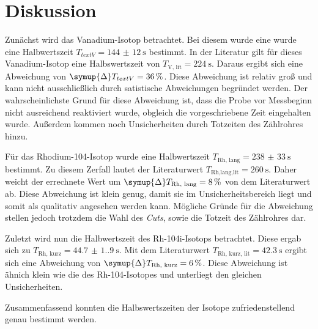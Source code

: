 \section{Diskussion}
\label{sec:Diskussion}
Zunächst wird das Vanadium-Isotop betrachtet. Bei diesem wurde eine wurde eine Halbwertszeit $T_{text{V}} = \qty{144(12)}{\second}$ bestimmt. In der Literatur gilt für dieses 
Vanadium-Isotop eine Halbswertszeit von $T_\text{V, lit} = \qty{224}{\second}$\cite{Zerfall}. Daraus ergibt sich eine Abweichung von $\symup{\Delta}T_{text{V}} = \qty{36}{\percent}$.
Diese Abweichung ist relativ groß und kann nicht ausschließlich durch satistische Abweichungen begründet werden. Der wahrscheinlichste Grund für diese Abweichung ist, dass 
die Probe vor Messbeginn nicht ausreichend reaktiviert wurde, obgleich die vorgeschriebene Zeit eingehalten wurde. Außerdem kommen noch Unsicherheiten durch Totzeiten
des Zählrohres hinzu. 

Für das Rhodium-104-Isotop wurde eine Halbwertszeit $T_\text{Rh, lang} = \qty{238(33)}{\second}$ bestimmt. Zu diesem Zerfall lautet der Literaturwert 
$T_\text{Rh,lang,lit} = \qty{260}{\second}$\cite{Zerfall}. Daher weicht der errechnete Wert um $\symup{\Delta}T_\text{Rh, lang} = \qty{8}{\percent}$ von dem Literaturwert ab.
Diese Abweichung ist klein genug, damit sie im Unsicherheitsbereich liegt und somit als qualitativ angesehen werden kann. Mögliche Gründe für die Abweichung stellen jedoch 
trotzdem die Wahl des \textit{Cuts}, sowie die Totzeit des Zählrohres dar.

Zuletzt wird nun die Halbwertszeit des Rh-104i-Isotops betrachtet. Diese ergab sich zu $T_\text{Rh, kurz} = \qty{44.7(1.9)}{\second}$. Mit dem Literaturwert 
$T_\text{Rh, kurz, lit} = \qty{42.3}{\second}$\cite{104iRh} ergibt sich eine Abweichung von $\symup{\Delta}T_\text{Rh, kurz} = \qty{6}{\percent}$. Diese Abweichung ist ähnich klein wie die 
des Rh-104-Isotopes und unterliegt den gleichen Unsicherheiten.

Zusammenfassend konnten die Halbswertszeiten der Isotope zufriedenstellend genau bestimmt werden.